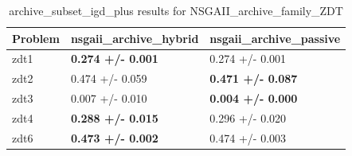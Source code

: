 \begin{table}
\caption{archive_subset_igd_plus results for NSGAII_archive_family_ZDT}
\label{NSGAII_archive_family_ZDT_archive_subset_igd_plus}
\begin{tabular}{lll}
\toprule
Problem & nsgaii_archive_hybrid & nsgaii_archive_passive \\
\midrule
zdt1 & \textbf{0.274 +/- 0.001} & 0.274 +/- 0.001 \\
zdt2 & 0.474 +/- 0.059 & \textbf{0.471 +/- 0.087} \\
zdt3 & 0.007 +/- 0.010 & \textbf{0.004 +/- 0.000} \\
zdt4 & \textbf{0.288 +/- 0.015} & 0.296 +/- 0.020 \\
zdt6 & \textbf{0.473 +/- 0.002} & 0.474 +/- 0.003 \\
\bottomrule
\end{tabular}
\end{table}
